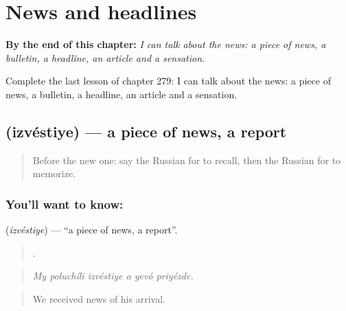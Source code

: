 
\chapter{News and headlines}
\label{ch:ru-news-and-headlines}

\begin{chapteropening}
\textbf{By the end of this chapter:} \emph{I can talk about the news: a piece of news, a bulletin, a headline, an article and a sensation.}

Complete the last lesson of chapter 279: I can talk about the news: a piece of news, a bulletin, a headline, an article and a sensation.
\end{chapteropening}

\section[\texorpdfstring{\ru{известие} (izvéstiye)}{известие (izvéstiye)}]{ (izvéstiye) — a piece of news, a report}

\label{lesson:RU-C279-izvestiye}



\begin{quote}
Before the new one: say the Russian for to recall, then the Russian for to memorize.
\end{quote}

\subsection*{You'll want to know: }
\textbf{} (\emph{izvéstiye}) — \textquotedblleft{}a piece of news, a report\textquotedblright{}.

\begin{quote}
     .
\end{quote}

\begin{quote}
\emph{My poluchíli izvéstiye o yevó priyézde.}
\end{quote}

\begin{quote}
We received news of his arrival.
\end{quote}

